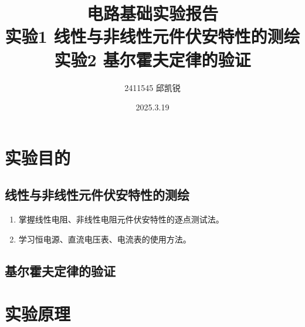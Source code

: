 \documentclass{article}
\title{{电路基础实验报告}\\{\small 实验1 线性与非线性元件伏安特性的测绘}\\{\small 实验2 基尔霍夫定律的验证}}
\author{2411545 邱凯锐}
\date{2025.3.19}
\begin{document}
\maketitle
\section{实验目的}

\subsection{线性与非线性元件伏安特性的测绘}
\begin{enumerate}
    \item 掌握线性电阻、非线性电阻元件伏安特性的逐点测试法。
    \item 学习恒电源、直流电压表、电流表的使用方法。
    \end{enumerate}
\subsection{基尔霍夫定律的验证}

\section{实验原理}
\end{document}
